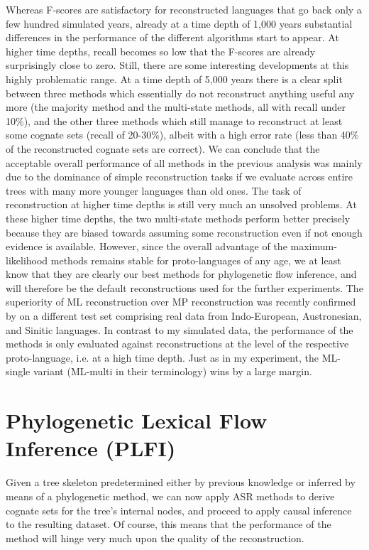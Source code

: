 Whereas F-scores are satisfactory for reconstructed languages that go back only a few hundred simulated years, already at a time depth of 1,000 years substantial differences in the performance of the different algorithms start to appear. At higher time depths, recall becomes so low that the F-scores are already surprisingly close to zero. Still, there are some interesting developments at this highly problematic range. At a time depth of 5,000 years there is a clear split between three methods which essentially do not reconstruct anything useful any more (the majority method and the multi-state methods, all with recall under 10\%), and the other three methods which still manage to reconstruct at least some cognate sets (recall of 20-30\%), albeit with a high error rate (less than 40\% of the reconstructed cognate sets are correct). We can conclude that the acceptable overall performance of all methods in the previous analysis was mainly due to the dominance of simple reconstruction tasks if we evaluate across 
entire trees with many more younger languages than old ones. The task of reconstruction at higher time depths is still very much an unsolved problems. At these higher time depths, the two multi-state methods perform better precisely because they are biased towards assuming some reconstruction even if not enough evidence is available. However, since the overall advantage of the maximum-likelihood methods remains stable for proto-lan\-guages of any age, we at least know that they are clearly our best methods for phylogenetic flow inference, and will therefore be the default reconstructions used for the further experiments. The superiority of ML reconstruction over MP reconstruction was recently confirmed by \cite{jaeger_list_2017} on a different test set comprising real data from Indo-European, Austronesian, and Sinitic languages. In contrast to my simulated data, the performance of the methods is only evaluated against reconstructions at the level of the respective proto-language, i.e. at a high time depth. Just 
as in my experiment, the ML-single variant (ML-multi in their terminology) wins by a large margin.

\section{Phylogenetic Lexical Flow Inference (PLFI)}\label{sec:6.8}
Given a tree skeleton predetermined either by previous knowledge or inferred by means of a phylogenetic method, we can now apply ASR methods to derive cognate sets for the tree's internal nodes, and proceed to apply causal inference to the resulting dataset. Of course, this means that the performance of the method will hinge very much upon the quality of the reconstruction.

